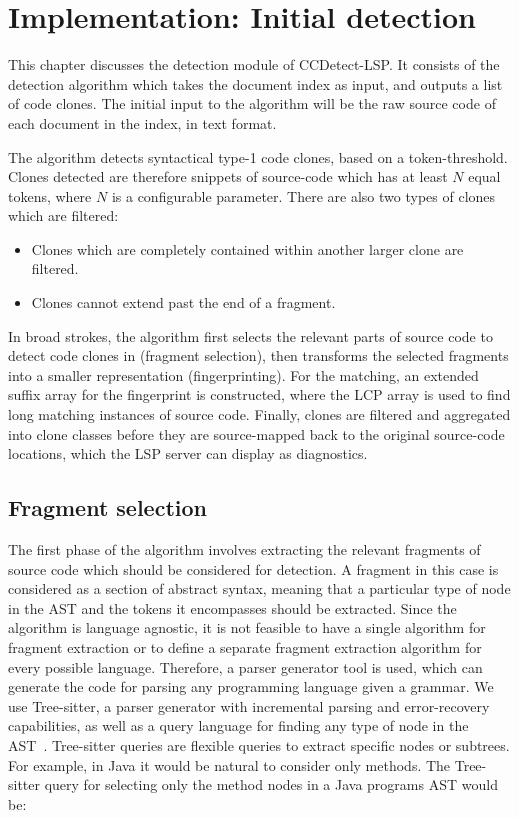 \chapter{Implementation: Initial detection}


This chapter discusses the detection module of CCDetect-LSP. It consists of the detection
algorithm which takes the document index as input, and outputs a list of code clones. The
initial input to the algorithm will be the raw source code of each document in the index,
in text format.

The algorithm detects syntactical type-1 code clones, based on a token-threshold. Clones
detected are therefore snippets of source-code which has at least $N$ equal tokens, where
$N$ is a configurable parameter. There are also two types of clones which are filtered:

\begin{itemize}
    \item Clones which are completely contained within another larger clone are filtered.
    \item Clones cannot extend past the end of a fragment.
\end{itemize}


In broad strokes, the algorithm first selects the relevant parts of source code to detect
code clones in (fragment selection), then transforms the selected fragments into a smaller
representation (fingerprinting). For the matching, an extended suffix array for the fingerprint
is constructed, where the LCP array is used to find long matching instances of source code.
Finally, clones are filtered and aggregated into clone classes before they are
source-mapped back to the original source-code locations, which the LSP server can display
as diagnostics.

\section{Fragment selection}

The first phase of the algorithm involves extracting the relevant fragments of source code
which should be considered for detection. A fragment in this case is considered as a
section of abstract syntax, meaning that a particular type of node in the AST and the
tokens it encompasses should be extracted. Since the algorithm is language agnostic, it is
not feasible to have a single algorithm for fragment extraction or to define a separate
fragment extraction algorithm for every possible language. Therefore, a parser generator
tool is used, which can generate the code for parsing any programming language given a
grammar. We use Tree-sitter, a parser generator with incremental parsing and
error-recovery capabilities, as well as a query language for finding any type of node in
the AST~\cite{treesitter}. Tree-sitter queries are flexible queries to extract specific
nodes or subtrees. For example, in Java it would be natural to consider only methods. The
Tree-sitter query for selecting only the method nodes in a Java programs AST would be:

